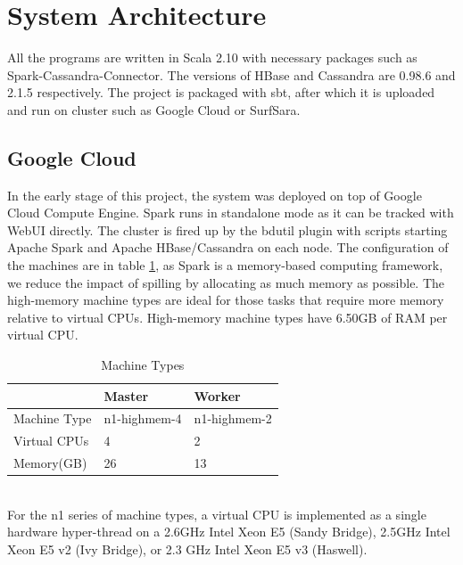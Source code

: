 \section{System Architecture}
All the programs are written in Scala 2.10 with necessary packages such as Spark-Cassandra-Connector. The versions of HBase and Cassandra are 0.98.6 and 2.1.5 respectively. The project is packaged with sbt, after which it is uploaded and run on cluster such as Google Cloud or SurfSara.
\subsection{Google Cloud}
In the early stage of this project, the system was deployed on top of Google Cloud Compute Engine. Spark runs in standalone mode as it can be tracked with WebUI directly. The cluster is fired up by the bdutil plugin with scripts starting Apache Spark and Apache HBase/Cassandra on each node. The configuration of the machines are in table \ref{machine-types}, as Spark is a memory-based computing framework, we reduce the impact of spilling by allocating as much memory as possible. The high-memory machine types are ideal for those tasks that require more memory relative to virtual CPUs. High-memory machine types have 6.50GB of RAM per virtual CPU.
\begin{table}[h!]
\def\arraystretch{2}
\centering
\caption{Machine Types}
\label{machine-types}
\begin{tabular}{l|l|l}
             & Master        & Worker        \\
\hline
Machine Type & n1-highmem-4 & n1-highmem-2 \\
\hline
Virtual CPUs & 4             & 2             \\
\hline
Memory(GB)   & 26            & 13          
\end{tabular}
\end{table}
\\For the n1 series of machine types, a virtual CPU is implemented as a single hardware hyper-thread on a 2.6GHz Intel Xeon E5 (Sandy Bridge), 2.5GHz Intel Xeon E5 v2 (Ivy Bridge), or 2.3 GHz Intel Xeon E5 v3 (Haswell).
